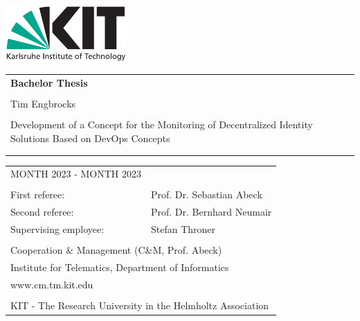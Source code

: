 \begin{titlepage}
\thispagestyle{empty}
\enlargethispage{2cm}

\sffamily
\vspace*{-3.2cm}
\hspace*{-0.6cm}
\includegraphics[height=2.14cm]{figures/kit-logo.png}

\begin{addmargin}{4cm}

\vfill

\begin{tabular}{p{12cm}}
	{\bfseries\huge Bachelor Thesis}\\
	\\
	{Tim Engbrocks} \vspace{2em} \\
	\\
	{\linespread{0.85}\selectfont \Huge Development of a Concept for the Monitoring of Decentralized Identity Solutions Based on DevOps Concepts\par}   \vspace{0.5em}\\
	{\LARGE } \vspace{0.5em} \\
	{\LARGE }
\end{tabular}
\vfill
\vfill
\vfill



\vspace{1em}
\begin{tabular}{ll}
	
        
	MONTH 2023 - MONTH 2023 \\
	\\
	First referee: 				& Prof. Dr. Sebastian Abeck \\
	Second referee:				& Prof. Dr. Bernhard Neumair \\
	Supervising employee:		& Stefan Throner \\
	\\
	\multicolumn{2}{l}{Cooperation \& Management (C\&M, Prof. Abeck)} \\
	\multicolumn{2}{l}{Institute for Telematics, Department of Informatics} \\
	\multicolumn{2}{l}{www.cm.tm.kit.edu} \\
	\\
	\multicolumn{2}{l}{\scriptsize{KIT - The Research University in the Helmholtz Association}}\\
\end{tabular}

\end{addmargin}
\newpage
\thispagestyle{empty}
\end{titlepage}